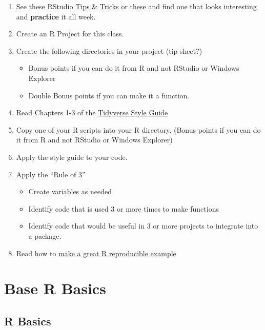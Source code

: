 \documentclass[]{book}
\providecommand{\tightlist}{%
  \setlength{\itemsep}{0pt}\setlength{\parskip}{0pt}}
\theoremstyle{definition}
\theoremstyle{definition}
\theoremstyle{definition}
\theoremstyle{remark}
\begin{document}
\begin{enumerate}
\def\labelenumi{\arabic{enumi}.}
\tightlist
\item
  See these RStudio
  \href{https://rviews.rstudio.com/categories/tips-and-tricks/}{Tips \&
  Tricks} or \href{https://twitter.com/rstudiotips}{these} and find one
  that looks interesting and \textbf{practice} it all week.
\item
  Create an R Project for this class.
\item
  Create the following directories in your project (tip sheet?)

  \begin{itemize}
  \tightlist
  \item
    Bonus points if you can do it from R and not RStudio or Windows
    Explorer
  \item
    Double Bonus points if you can make it a function.
  \end{itemize}
\item
  Read Chapters 1-3 of the
  \href{http://style.tidyverse.org/index.html}{Tidyverse Style Guide}
\item
  Copy one of your R scripts into your R directory. (Bonus points if you
  can do it from R and not RStudio or Windows Explorer)
\item
  Apply the style guide to your code.\\
\item
  Apply the ``Rule of 3''

  \begin{itemize}
  \tightlist
  \item
    Create variables as needed
  \item
    Identify code that is used 3 or more times to make functions
  \item
    Identify code that would be useful in 3 or more projects to
    integrate into a package.
  \end{itemize}
\item
  Read how to
  \href{https://stackoverflow.com/questions/5963269/how-to-make-a-great-r-reproducible-example}{make
  a great R reproducible example}
\end{enumerate}

\part{Base R Basics}\label{part-base-r-basics}

\chapter{R Basics}\label{baser-rbasics}
\end{document}

